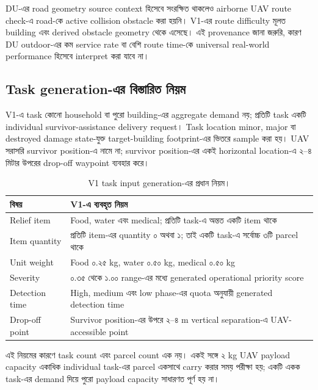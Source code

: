 \documentclass[10pt,a4paper]{article}
\begin{document}
DU-এর road geometry source context হিসেবে সংরক্ষিত থাকলেও airborne UAV route
check-এ road-কে active collision obstacle করা হয়নি। V1-এর route difficulty মূলত
building এবং derived obstacle geometry থেকে এসেছে। এই provenance জানা জরুরি,
কারণ DU outdoor-এর কম service rate বা বেশি route time-কে universal real-world
performance হিসেবে interpret করা যাবে না।

\subsection{Task generation-এর বিস্তারিত নিয়ম}

V1-এ task কোনো household বা পুরো building-এর aggregate demand নয়; প্রতিটি task
একটি individual survivor-assistance delivery request। Task location minor, major
বা destroyed damage state-যুক্ত target-building footprint-এর ভিতরে sample করা
হয়। UAV সরাসরি survivor position-এ নামে না; survivor position-এর একই
horizontal location-এ ২--৪ মিটার উপরের drop-off waypoint ব্যবহার করে।

\begin{table}[htbp]
\centering
\caption{V1 task input generation-এর প্রধান নিয়ম।}
\label{tab:task-generation-bn}
\scriptsize
{}
\begin{tabular}{@{}p{}p{}@{}}
\toprule
বিষয় & V1-এ ব্যবহৃত নিয়ম \\
\midrule
Relief item & Food, water এবং medical; প্রতিটি task-এ অন্তত একটি item থাকে \\
Item quantity & প্রতিটি item-এর quantity ০ অথবা ১; তাই একটি task-এ সর্বোচ্চ ৩টি parcel থাকে \\
Unit weight & Food ০.২৫ kg, water ০.৫০ kg, medical ০.৫০ kg \\
Severity & ০.৩৫ থেকে ১.০০ range-এর মধ্যে generated operational priority score \\
Detection time & High, medium এবং low phase-এর quota অনুযায়ী generated detection time \\
Drop-off point & Survivor position-এর উপরে ২--৪ m vertical separation-এ UAV-accessible point \\
\bottomrule
\end{tabular}
\end{table}

এই নিয়মের কারণে task count এবং parcel count এক নয়। একই সঙ্গে ২ kg UAV payload
capacity একাধিক individual task-এর parcel একসাথে carry করার সময় পরীক্ষা হয়;
একটি একক task-এর demand দিয়ে পুরো payload capacity সাধারণত পূর্ণ হয় না।
\end{document}
